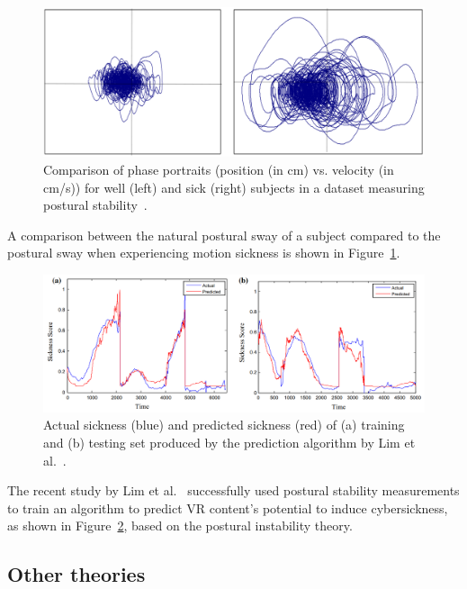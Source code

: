 \begin{figure}[h]
    \centering
    \includegraphics[width=\textwidth]{content/2_related_work/img/PosturalStability[Smart2013]}
    \caption{Comparison of phase portraits (position (in cm) vs. velocity (in cm/s)) for well (left) and sick (right)
        subjects in a dataset measuring postural stability~\cite{Smart2013}.}
    \label{fig:postural-instability-sample}
\end{figure}
A comparison between the natural postural sway of a subject compared to the postural sway when experiencing motion
sickness is shown in Figure~\ref{fig:postural-instability-sample}.
\begin{figure}[h]
    \centering
    \includegraphics[width=\textwidth]{content/2_related_work/img/PosturalStabilitySicknessPrediction[Lim2020]}
    \caption{Actual sickness (blue) and predicted sickness (red) of (a) training and (b) testing set produced by the
    prediction algorithm by Lim et al.~\cite{Lim2020}.}
    \label{fig:sickness-prediction-algorithm}
\end{figure}
The recent study by Lim et al.~\cite{Lim2020} successfully used postural stability measurements to train an algorithm
to predict VR content's potential to induce cybersickness, as shown in Figure~\ref{fig:sickness-prediction-algorithm},
based on the postural instability theory.


\subsection{Other theories}\label{subsec:other-theories}

